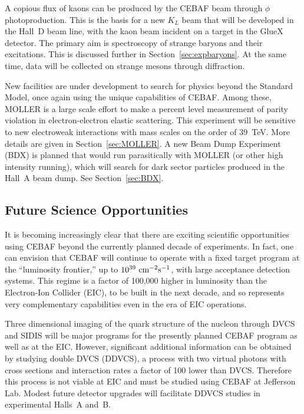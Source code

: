 A copious flux of kaons can be produced by the CEBAF beam through $\phi$ photoproduction. This is the basis for a new $K_L$ beam that will be developed in the Hall~D beam line, with the kaon beam incident on a target in the GlueX detector. The primary aim is spectroscopy of strange baryons and their excitations. This is discussed further in Section~\ref{sec:expbaryons}. At the same time, data will be collected on strange mesons through diffraction. 

New facilities are under development to search for physics beyond the Standard Model, once again using the unique capabilities of CEBAF. %
Among these, MOLLER is a large scale effort to make a percent level measurement of parity violation in electron-electron elastic scattering. This experiment will be sensitive to new electroweak interactions with mass scales on the order of 39~TeV. %
More details are given in Section~\ref{sec:MOLLER}. A new Beam Dump Experiment (BDX) is planned that would run parasitically with MOLLER (or other high intensity running), which will search for dark sector particles produced in the Hall~A beam dump. See Section~\ref{sec:BDX}.

\subsection{Future Science Opportunities}

It is becoming increasingly clear that there are exciting scientific opportunities using CEBAF beyond the currently planned decade of experiments. %
In fact, one can envision that CEBAF will continue to operate with a fixed target program at the ``luminosity frontier,'' up to $10^{39}~{\rm cm}^{-2}{\rm s}^{-1}$, with large acceptance detection systems. This regime is a factor of 100,000 higher in luminosity than the Electron-Ion Collider (EIC), to be built in the next decade, and so represents very complementary capabilities even in the era of EIC operations.

Three dimensional imaging of the quark structure of the nucleon through DVCS and SIDIS 
will be major programs for the presently planned CEBAF program as well as at the EIC. However, significant additional information can be obtained by studying double DVCS (DDVCS), a process with two virtual photons with cross sections and interaction rates a factor of 100 lower than DVCS. Therefore this process is not viable at EIC and must be studied using CEBAF at Jefferson Lab. Modest future detector upgrades will facilitate DDVCS studies in experimental Halls~A and~B.

